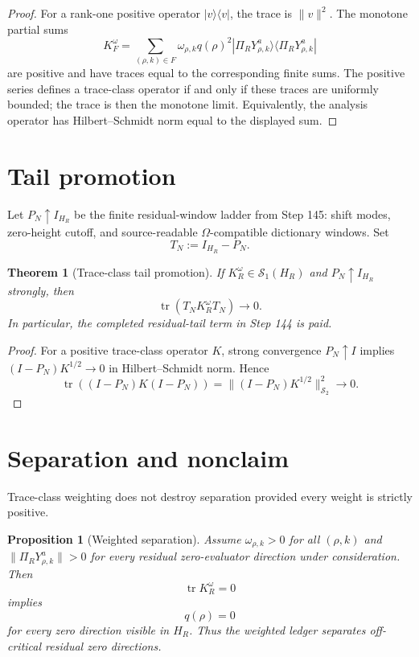 \documentclass[11pt]{article}
\newtheorem{theorem}{Theorem}
\newtheorem{proposition}{Proposition}
\begin{document}
\begin{proof}
For a rank-one positive operator $|v\rangle\langle v|$, the trace is $\|v\|^2$.  The monotone partial sums
\[
K_F^\omega=\sum_{(\rho,k)\in F}\omega_{\rho,k}q(\rho)^2|\Pi_RY^a_{\rho,k}\rangle\langle\Pi_RY^a_{\rho,k}|
\]
are positive and have traces equal to the corresponding finite sums.  The positive series defines a trace-class operator if and only if these traces are uniformly bounded; the trace is then the monotone limit.  Equivalently, the analysis operator has Hilbert--Schmidt norm equal to the displayed sum.
\end{proof}

\section{Tail promotion}
Let $P_N\uparrow I_{H_R}$ be the finite residual-window ladder from Step 145: shift modes, zero-height cutoff, and source-readable $\Omega$-compatible dictionary windows.  Set
\[
T_N:=I_{H_R}-P_N.
\]

\begin{theorem}[Trace-class tail promotion]
If $K_R^{\omega}\in\mathcal S_1(H_R)$ and $P_N\uparrow I_{H_R}$ strongly, then
\[
\boxed{
\operatorname{tr}(T_NK_R^{\omega}T_N)\to0.
}
\]
In particular, the completed residual-tail term in Step 144 is paid.
\end{theorem}

\begin{proof}
For a positive trace-class operator $K$, strong convergence $P_N\uparrow I$ implies $(I-P_N)K^{1/2}\to0$ in Hilbert--Schmidt norm.  Hence
\[
\operatorname{tr}((I-P_N)K(I-P_N))
=\|(I-P_N)K^{1/2}\|_{\mathcal S_2}^2\to0.
\]
\end{proof}

\section{Separation and nonclaim}
Trace-class weighting does not destroy separation provided every weight is strictly positive.

\begin{proposition}[Weighted separation]
Assume $\omega_{\rho,k}>0$ for all $(\rho,k)$ and $\|\Pi_RY^a_{\rho,k}\|>0$ for every residual zero-evaluator direction under consideration.  Then
\[
\operatorname{tr}K_R^{\omega}=0
\]
implies
\[
q(\rho)=0
\]
for every zero direction visible in $H_R$.  Thus the weighted ledger separates off-critical residual zero directions.
\end{proposition}
\end{document}
